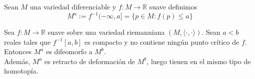 \begin{definition}
    Sean $M$ una variedad diferenciable y $f:M\to\mathbb{R}$ suave definimos
    \begin{equation*}
        M^a := f^{-1}(-\infty,a] =\{p\in M: f(p)\le a\}
    \end{equation*}
\end{definition}

\begin{theorem}
\label{retractodef}
    Sea $f:M\to\mathbb{R}$ suave sobre una variedad riemanniana $(M,\langle\cdot,\cdot\rangle)$. Sean $a<b$ reales tales que $f^{-1}[a,b]$ es compacto y no contiene ningún punto crítico de $f$. Entonces $M^a$ es difeomorfo a $M^b$.\\
    Además, $M^a$ es retracto de deformación de $M^b$, luego tienen en el mismo tipo de homotopía.
\end{theorem}

